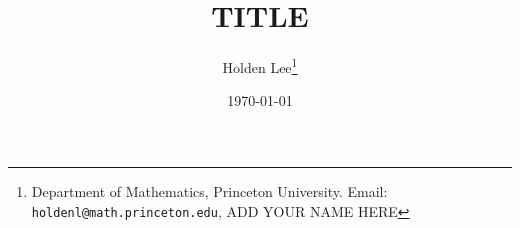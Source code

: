 \documentclass[11pt]{article}
\begin{document}
\title{TITLE}

\author{Holden Lee\thanks{Department of Mathematics,
Princeton University.
Email: \texttt{holdenl@math.princeton.edu}, ADD YOUR NAME HERE }}


\date{\today}
\maketitle

\begin{abstract}
\end{abstract} 

%

\printbibliography
\end{document}

